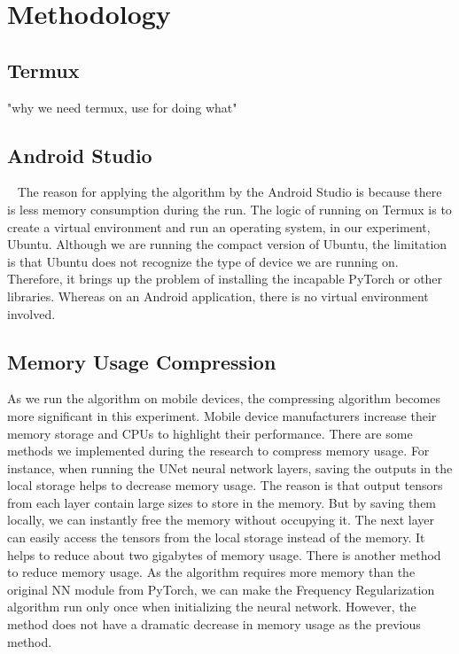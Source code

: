 \documentclass[conference]{IEEEtran}
\begin{document}
\section{Methodology}\label{methodology}
\subsection{Termux}
"why we need termux, use for doing what"

\subsection{Android Studio}~\label{as_method}
The reason for applying the algorithm by the Android Studio is because there is less memory consumption during the run. The logic of running on Termux is to create a virtual environment and run an operating system, in our experiment, Ubuntu. Although we are running the compact version of Ubuntu, the limitation is that Ubuntu does not recognize the type of device we are running on. Therefore, it brings up the problem of installing the incapable PyTorch or other libraries. Whereas on an Android application, there is no virtual environment involved. 

\subsection{Memory Usage Compression}
As we run the algorithm on mobile devices, the compressing algorithm becomes more significant in this experiment. Mobile device manufacturers increase their memory storage and CPUs to highlight their performance. There are some methods we implemented during the research to compress memory usage. For instance, when running the UNet neural network layers, saving the outputs in the local storage helps to decrease memory usage. The reason is that output tensors from each layer contain large sizes to store in the memory. But by saving them locally, we can instantly free the memory without occupying it. The next layer can easily access the tensors from the local storage instead of the memory. It helps to reduce about two gigabytes of memory usage. There is another method to reduce memory usage. As the algorithm requires more memory than the original NN module from PyTorch, we can make the Frequency Regularization algorithm run only once when initializing the neural network. However, the method does not have a dramatic decrease in memory usage as the previous method. 
\end{document}
